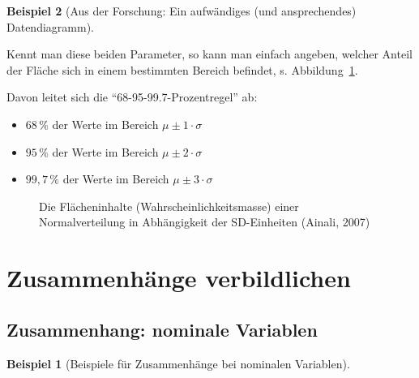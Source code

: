 \documentclass[
  a4paper,
]{scrbook}
\providecommand{\tightlist}{%
  \setlength{\itemsep}{0pt}\setlength{\parskip}{0pt}}\usepackage{longtable,booktabs,array}
\theoremstyle{definition}
\newtheorem{example}{Beispiel}[chapter]
\theoremstyle{definition}
\theoremstyle{definition}
\theoremstyle{remark}
\begin{document}
\begin{example}[Aus der Forschung: Ein aufwändiges (und ansprechendes)
Datendiagramm]
\begin{tcolorbox}
\end{tcolorbox}

Kennt man diese beiden Parameter, so kann man einfach angeben, welcher
Anteil der Fläche sich in einem bestimmten Bereich befindet, s.
Abbildung~\ref{fig-norm-perc}.

Davon leitet sich die ``68-95-99.7-Prozentregel'' ab:

\begin{itemize}
\tightlist
\item
  \(68\,\%\) der Werte im Bereich \(\mu\pm 1 \cdot \sigma\)
\item
  \(95\,\%\) der Werte im Bereich \(\mu\pm 2 \cdot \sigma\)
\item
  \(99{,}7\,\%\) der Werte im Bereich \(\mu\pm 3 \cdot \sigma\)
\end{itemize}

\begin{figure}


\caption{\label{fig-norm-perc}Die Flächeninhalte
(Wahrscheinlichkeitsmasse) einer Normalverteilung in Abhängigkeit der
SD-Einheiten (Ainali, 2007)}

\end{figure}%

\section{Zusammenhänge
verbildlichen}\label{zusammenhuxe4nge-verbildlichen}

\subsection{Zusammenhang: nominale
Variablen}\label{zusammenhang-nominale-variablen}

\begin{example}[Beispiele für Zusammenhänge bei nominalen
Variablen]\protect\hypertarget{exm-nom-zshg}{}\label{exm-nom-zshg}


\end{example}
\end{example}
\end{document}

